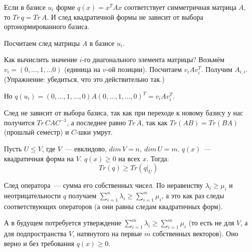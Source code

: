 Если в базисе $u_i$ форме $q(x)=x^TAx$ соответствует симметричная матрица $A$, то $Tr\,q=Tr\,A$. И след квадратичной формы не зависит от выбора ортонормированного базиса.

\proofname

Посчитаем след матрицы $A$ в базисе $u_i$.

Как вычислить значение $i$-го диагонального элемента матрицы? Возьмём $v_i=(0,\ldots,1,\ldots 0)$ (единица на $v$-ой позиции). Посчитаем $v_iAv_i^T$. Получим $A_{i, i}$. (Упражнение: убедиться, что это действительно так.)

Но $q(u_i) = (0,\ldots,1,\ldots,0)A(0,\ldots,1,\ldots,0)^T = v_iAv_i^T$.

След не зависит от выбора базиса, так как при переходе к новому базису у нас получится $Tr\,CAC^{-1}$, а последнее равно $Tr\,A$, так как $Tr(AB)=Tr(BA)$ (прошлый семестр) и $C$-шки умрут.


Пусть $U\le V$, где $V$~--- евклидово, $dim\,V = n,\ dim\,U = m$. $q(x)$~--- квадратичная форма на $V$. $q(x)\ge 0$ на всех $x$. Тогда:
$$
Tr(q)\ge Tr(q|_U)
$$

\proofname

След оператора~--- сумма его собственных чисел. По неравенству $\lambda_i\ge\mu_i$ и неотрицательности $q$ получаем $\sum\limits_{i=1}^n \lambda_i \ge \sum\limits_{i=1}^m \mu_i$, а это как раз следы соответствующих операторов (а они равны следам квадратичных форм).

\rem А в будущем потребуется утверждение $\sum\limits_{i = 1}^m \lambda_i \ge \sum\limits_{i = 1}^m \mu_i$ (то есть не для $V$, а для подпространства $V$, натянутого на первые $m$ собственных векторов). Оно верно и без требования $q(x)\ge 0$.
